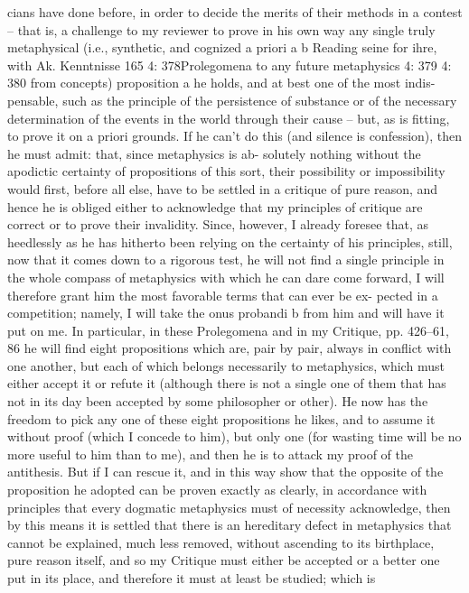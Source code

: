 cians have done before, in order to decide the merits of their methods
in a contest – that is, a challenge to my reviewer to prove in his own
way any single truly metaphysical (i.e., synthetic, and cognized a priori
a
b
Reading seine for ihre, with Ak.
Kenntnisse
165
4: 378Prolegomena to any future metaphysics
4: 379
4: 380
from concepts) proposition a he holds, and at best one of the most indis-
pensable, such as the principle of the persistence of substance or of the
necessary determination of the events in the world through their cause
– but, as is ﬁtting, to prove it on a priori grounds. If he can’t do this (and
silence is confession), then he must admit: that, since metaphysics is ab-
solutely nothing without the apodictic certainty of propositions of this
sort, their possibility or impossibility would ﬁrst, before all else, have to
be settled in a critique of pure reason, and hence he is obliged either to
acknowledge that my principles of critique are correct or to prove their
invalidity. Since, however, I already foresee that, as heedlessly as he has
hitherto been relying on the certainty of his principles, still, now that it
comes down to a rigorous test, he will not ﬁnd a single principle in the
whole compass of metaphysics with which he can dare come forward, I
will therefore grant him the most favorable terms that can ever be ex-
pected in a competition; namely, I will take the onus probandi b from him
and will have it put on me.
In particular, in these Prolegomena and in my Critique, pp. 426–61, 86 he
will ﬁnd eight propositions which are, pair by pair, always in conﬂict with
one another, but each of which belongs necessarily to metaphysics, which
must either accept it or refute it (although there is not a single one of
them that has not in its day been accepted by some philosopher or other).
He now has the freedom to pick any one of these eight propositions he
likes, and to assume it without proof (which I concede to him), but only
one (for wasting time will be no more useful to him than to me), and
then he is to attack my proof of the antithesis. But if I can rescue it,
and in this way show that the opposite of the proposition he adopted
can be proven exactly as clearly, in accordance with principles that every
dogmatic metaphysics must of necessity acknowledge, then by this means
it is settled that there is an hereditary defect in metaphysics that cannot
be explained, much less removed, without ascending to its birthplace,
pure reason itself, and so my Critique must either be accepted or a better
one put in its place, and therefore it must at least be studied; which is
